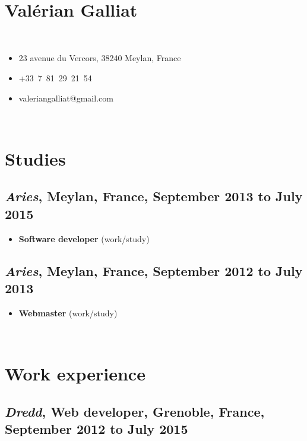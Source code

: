 \documentclass[a4paper]{article}
\begin{document}
~

\section*{\huge Valérian Galliat}

~

\begin{itemize}
  \item 23 avenue du Vercors, 38240 Meylan, France
  \item +33~7~81~29~21~54
  \item valeriangalliat@gmail.com
\end{itemize}

~

\section*{Studies}

\subsection*{
  \textit{Aries},
  Meylan, France,
  September 2013 to July 2015
}

\begin{itemize}
  \item
    \textbf{Software developer}
    {\footnotesize (work/study)}
\end{itemize}

\subsection*{
  \textit{Aries},
  Meylan, France,
  September 2012 to July 2013
}

\begin{itemize}
  \item
    \textbf{Webmaster}
    {\footnotesize (work/study)}
\end{itemize}

~

\section*{Work experience}

\subsection*{
  \textit{Dredd},
  \textbf{Web developer},
  Grenoble, France,
  September 2012 to July 2015
}
\end{document}
